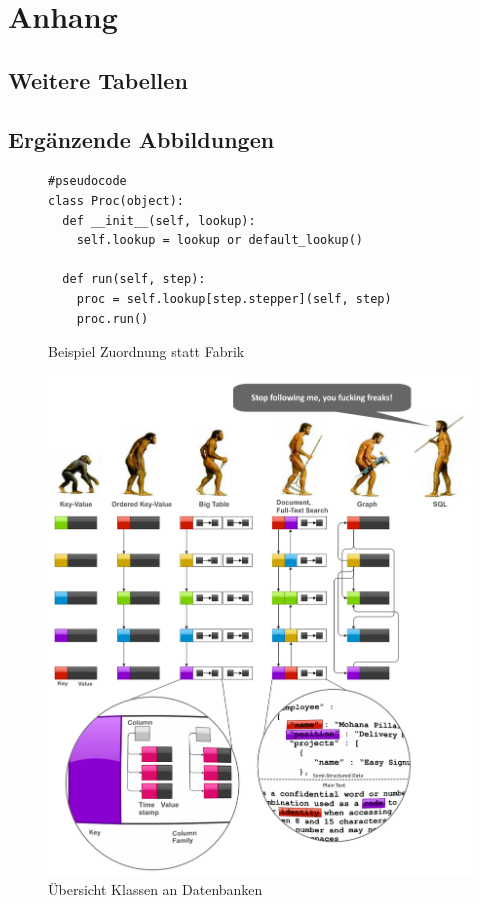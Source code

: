 \appendix
\chapter{Anhang}
\section{Weitere Tabellen}




\section{Ergänzende Abbildungen}

\begin{figure}[h]
\begin{verbatim}
#pseudocode
class Proc(object):
  def __init__(self, lookup):
    self.lookup = lookup or default_lookup()

  def run(self, step):
    proc = self.lookup[step.stepper](self, step)
    proc.run()
\end{verbatim}
\caption{Beispiel Zuordnung statt Fabrik}
\label{fig:fabrik-mapping}
\end{figure}


\begin{figure}
    \includegraphics[width=\textwidth]{images/databases-overview.png}
    \caption{Übersicht Klassen an Datenbanken}
    \label{fig:klassen-datenbanken}
\end{figure}
